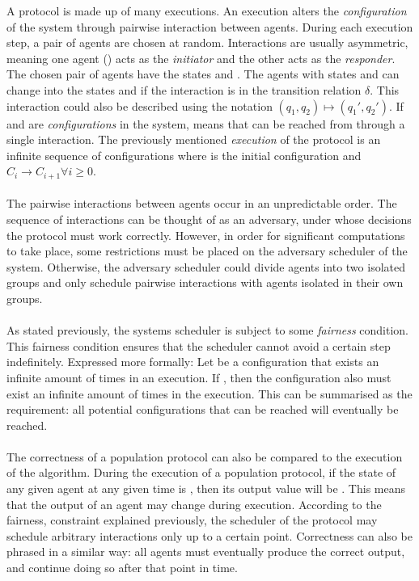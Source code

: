 A protocol is made up of many executions. An execution alters the \emph{configuration} of the system through pairwise interaction between agents. During each execution step, a pair of agents  are chosen at random. Interactions are usually asymmetric, meaning one agent () acts as the \emph{initiator} and the other  acts as the \emph{responder}. The chosen pair of agents have the states  and . The agents with states  and  can change into the states  and  if the interaction  is in the transition relation $\delta$. This interaction could also be described using the notation $(q_1, q_2) \mapsto (q_1', q_2')$.  If  and  are \emph{configurations} in the system,  means that  can be reached from  through a single interaction. The previously mentioned \emph{execution} of the protocol is an infinite sequence of configurations  where  is the initial configuration and $C_i \rightarrow C_{i+1} \forall i \geq 0$. 
\\\\
The pairwise interactions between agents occur in an unpredictable order. The sequence of interactions can be thought of as an adversary, under whose decisions the protocol must work correctly. However, in order for significant computations to take place, some restrictions must be placed on the adversary scheduler of the system. Otherwise, the adversary scheduler could divide agents into two isolated groups and only schedule pairwise interactions with agents isolated in their own groups.  
\\\\
As stated previously, the systems scheduler is subject to some \emph{fairness} condition. This fairness condition ensures that the scheduler cannot avoid a certain step indefinitely. Expressed more formally: Let  be a configuration that exists an infinite amount of times in an execution. If , then the configuration  also must exist an infinite amount of times in the execution. This can be summarised as the requirement: all potential configurations that can be reached will eventually be reached.
\\\\ 
The correctness of a population protocol can also be compared to the execution of the algorithm. During the execution of a population protocol, if the state of any given agent at any given time is , then its output value will be . This means that the output of an agent may change during execution. According to the fairness, constraint explained previously, the scheduler of the protocol may schedule arbitrary interactions only up to a certain point. Correctness can also be phrased in a similar way: all agents must eventually produce the correct output, and continue doing so after that point in time.

